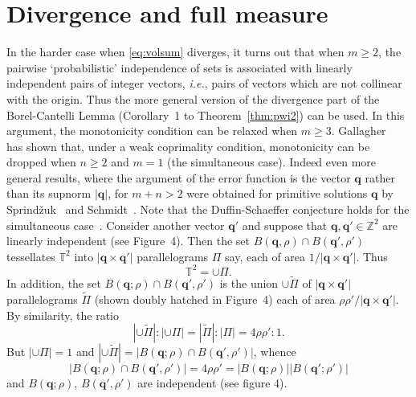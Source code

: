 \documentclass[reqno]{amsart}
\renewcommand{\ge}{\geqslant}
\newcommand{\T}{{\mathbb{T}}}
\newcommand{\Z}{{\mathbb{Z}}}
\newcommand{\0}{{\mathbf{0}}}
\newcommand{\q}{{\mathbf{q}}}
\newcommand{\ie}{{\it{i.e.}}}
\newcommand{\Spr}{Sprind{\v z}uk}
\begin{document}
\section{Divergence and full measure}

In the harder case when \eqref{eq:volsum} diverges, it turns out that
when $m\ge2$, the pairwise `probabilistic' independence of sets is
associated with linearly independent pairs of integer vectors, \ie,
pairs of vectors which are not collinear with the origin. Thus the
more general version of the divergence part of the Borel-Cantelli
Lemma (Corollary~1 to Theorem~\ref{thm:pwi2}) can be used.  
In this argument, the monotonicity condition can be relaxed when $m\ge
3$.
Gallagher~\cite{Gallagher65} has shown that, under a weak coprimality
condition, monotonicity can be dropped when $n\ge 2$ and $m=1$ (the
simultaneous case). Indeed even more general results, where the
argument of the error function is the vector $\q$ rather than its
supnorm $|\q|$, for $m+n>2$ were obtained for primitive solutions $\q$
by \Spr~\cite{Sprindzuk} and Schmidt~\cite{HarmanMNT}. Note that the
Duffin-Schaeffer conjecture holds for the simultaneous
case~\cite{PV90}.
Consider another vector $\q'$ and suppose that $\q, \q' \in \Z^2$ are
linearly independent (see Figure~4).  Then the set $B(\q,\rho)\cap
B(\q',\rho')$ tessellates $\T^2$ into $|\q\times \q'|$ parallelograms
$\Pi$ say, each of area $1/|\q \times \q'|$. Thus
$$
\T^2 = \cup \Pi.
$$
In addition, the set $B(\q;\rho) \cap B(\q',\rho')$ is the union $\cup
\widetilde \Pi$ of $|\q\times \q'|$ parallelograms $\widetilde\Pi$
(shown doubly hatched in Figure~4) each of area $\rho \rho'/|\q \times
\q'|$.  By similarity, the ratio
$$
|\cup \tilde \Pi|:|\cup \Pi| = |\widetilde \Pi|:|\Pi| = 4\rho \rho':1.
$$
 But $|\cup \Pi| = 1$ and $|\cup \widetilde \Pi| 
= | B(\q;\rho) \cap B(\q',\rho')|$, whence
\begin{equation}
  \label{eq:Bli}
 | B(\q;\rho) \cap B(\q',\rho')|=4\rho \rho' =|B(\q;\rho)||B(\q';\rho')| 
\end{equation}
and $B(\q;\rho)$, $B(\q',\rho')$ are independent (see figure 4).
\end{document}
